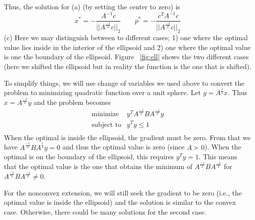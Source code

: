 \documentclass[12pt] {article}
\begin{document}
Thus, the solution for (a) (by setting the center to zero) is 
$$
x^{*} = - \frac{A^{-1}c}{||A^{\frac{-1}{2}}c ||_{2}} \quad \quad p^{*}= - \frac{c^{T}A^{-1}c}{||A^{\frac{-1}{2}}c ||_{2}}
$$
(c) Here we may distinguish between to different cases; 1) one where the optimal value lies inside in the interior of the ellipsoid and 2) one where the optimal value is one the boundary of the ellipsoid. Figure ~\ref{fig:ell} shows the two different cases (here we shifted the ellipsoid but in reality the function is the one that is shifted).

To simplify things, we will use change of variables we used above to convert the problem to minimizing quadratic function over a unit sphere. Let $y = A^{\frac{1}{2}}x$. Thus $x = A^{\frac{-1}{2}}y $ and the problem becomes 
\[
\begin{array}{cl}
\text{minimize} & y^{T}A^{\frac{-1}{2}} B A^{\frac{-1}{2}}y\\
\text{subject to} & y^{T}y \leq 1\\
\end{array} 
\]
When the optimal is inside the ellipsoid, the gradient must be zero. From that we have $A^{\frac{-1}{2}}BA^{\frac{1}{2}}y=0$ and thus the optimal value is zero (since $A \succ 0$). When the optimal is on the boundary of the ellipsoid, this requires $y^{T}y = 1$. This means that the optimal value is the one that obtains the minimum of $A^{\frac{-1}{2}} B A^{\frac{-1}{2}}$ for $A^{\frac{-1}{2}} B A^{\frac{-1}{2}} \neq 0$.

For the nonconvex extension, we will still seek the gradient to be zero (i.e., the optimal value is inside the ellipsoid) and the solution is similar to the convex case. Otherwise, there could be many solutions for the second case. 
\end{document}
